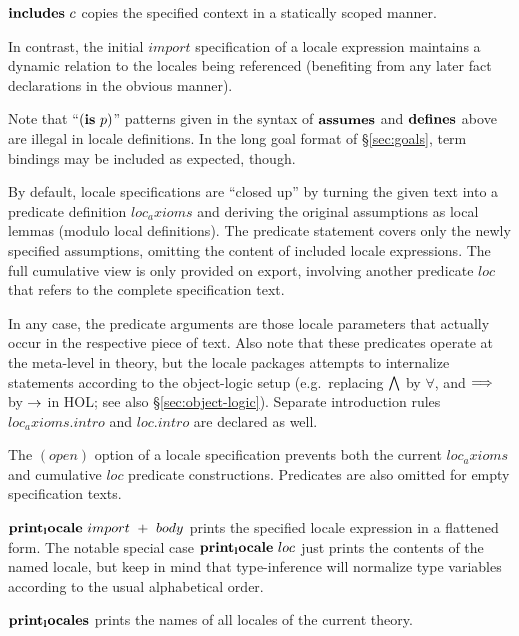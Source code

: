 \begin{descr}
\begin{descr}
  \item [${\mathord{\mathbf{includes}}}~c$] copies the specified context in a statically scoped
    manner.

    In contrast, the initial $import$ specification of a locale expression
    maintains a dynamic relation to the locales being referenced (benefiting
    from any later fact declarations in the obvious manner).
  \end{descr}
  
  Note that ``$({\mathord{\mathbf{is}}}~p)$'' patterns given in the syntax of ${\mathord{\mathbf{assumes}}}$ and
  ${\mathord{\mathbf{defines}}}$ above are illegal in locale definitions.  In the long goal
  format of \S\ref{sec:goals}, term bindings may be included as expected,
  though.
  
  \medskip By default, locale specifications are ``closed up'' by turning the
  given text into a predicate definition $loc_axioms$ and deriving the
  original assumptions as local lemmas (modulo local definitions).  The
  predicate statement covers only the newly specified assumptions, omitting
  the content of included locale expressions.  The full cumulative view is
  only provided on export, involving another predicate $loc$ that refers to
  the complete specification text.
  
  In any case, the predicate arguments are those locale parameters that
  actually occur in the respective piece of text.  Also note that these
  predicates operate at the meta-level in theory, but the locale packages
  attempts to internalize statements according to the object-logic setup
  (e.g.\ replacing $\bigwedge$ by $\forall$, and $\Longrightarrow$ by $\rightarrow$ in HOL; see
  also \S\ref{sec:object-logic}).  Separate introduction rules
  $loc_axioms.intro$ and $loc.intro$ are declared as well.
  
  The $(open)$ option of a locale specification prevents both the current
  $loc_axioms$ and cumulative $loc$ predicate constructions.  Predicates are
  also omitted for empty specification texts.

\item [${\mathord{\mathbf{print_locale}}}~import~+~body$] prints the specified locale
  expression in a flattened form.  The notable special case
  ${\mathord{\mathbf{print_locale}}}~loc$ just prints the contents of the named
  locale, but keep in mind that type-inference will normalize type variables
  according to the usual alphabetical order.

\item [${\mathord{\mathbf{print_locales}}}$] prints the names of all locales of the
  current theory.

\end{descr}


